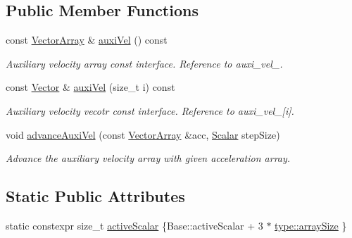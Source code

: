 \subsection*{Public Member Functions}
\begin{DoxyCompactItemize}
\item 
const \mbox{\hyperlink{class_vel_indep_particles_a27580f65b6523bfb6900520af2e44708}{Vector\+Array}} \& \mbox{\hyperlink{class_vel_dep_particles_a90f7baf617b3419dac92fc4d0b6388e9}{auxi\+Vel}} () const
\begin{DoxyCompactList}\small\item\em Auxiliary velocity array const interface. Reference to auxi\+\_\+vel\+\_\+. \end{DoxyCompactList}\item 
const \mbox{\hyperlink{class_vel_indep_particles_aa7e03da81f44941c06abf43ec2180079}{Vector}} \& \mbox{\hyperlink{class_vel_dep_particles_a3faade86a7d8f0f55d92410e479c5736}{auxi\+Vel}} (size\+\_\+t i) const
\begin{DoxyCompactList}\small\item\em Auxiliary velocity vecotr const interface. Reference to auxi\+\_\+vel\+\_\+\mbox{[}i\mbox{]}. \end{DoxyCompactList}\item 
void \mbox{\hyperlink{class_vel_dep_particles_a01ef2a76b8cb3b53eb92e41104a3df6f}{advance\+Auxi\+Vel}} (const \mbox{\hyperlink{class_vel_indep_particles_a27580f65b6523bfb6900520af2e44708}{Vector\+Array}} \&acc, \mbox{\hyperlink{class_vel_indep_particles_a5d275b22f0d759f360ddd80e78f4b466}{Scalar}} step\+Size)
\begin{DoxyCompactList}\small\item\em Advance the auxiliary velocity array with given acceleration array. \end{DoxyCompactList}\end{DoxyCompactItemize}
\subsection*{Static Public Attributes}
\begin{DoxyCompactItemize}
\item 
static constexpr size\+\_\+t \mbox{\hyperlink{class_vel_dep_particles_a5a6db2817ec1f38c80ec80586e00f03e}{active\+Scalar}} \{Base\+::active\+Scalar + 3 $\ast$ \mbox{\hyperlink{struct_space_h_1_1_proto_type_a52e6df98534a97aa207f4447abd14d3c}{type\+::array\+Size}} \}
\end{DoxyCompactItemize}
